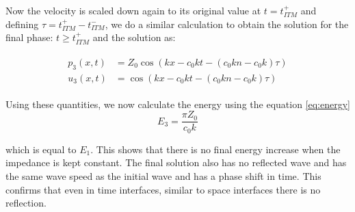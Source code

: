 Now the velocity is scaled down again to its original value at $t=t_{ITM}^+$ and defining $\tau = t_{ITM}^+ - t_{ITM}^-$, we do a similar calculation to obtain the solution for the final phase: $t \geq t_{ITM}^+$ and the solution as:

\begin{align}
    \begin{split}
        p_3\left(x, t\right) & = Z_{0} \cos\left(kx - c_{0} k t - {\left(c_{0} k n - c_{0} k\right)} \tau\right)\\
        u_3\left(x, t\right) & =  \cos\left(kx - c_{0} k t - {\left(c_{0} k n - c_{0} k\right)} \tau\right)
    \end{split}
\end{align}

Using these quantities, we now calculate the energy using the equation \ref{eq:energy}
\begin{equation}
    E_3 = \frac{\pi Z_0}{c_0 k}
\end{equation}

which is equal to $E_1$. This shows that there is no final energy increase when the impedance is kept constant. The final solution also has no reflected wave and has the same wave speed as the initial wave and has a phase shift in time. This confirms that even in time interfaces, similar to space interfaces there is no reflection.


